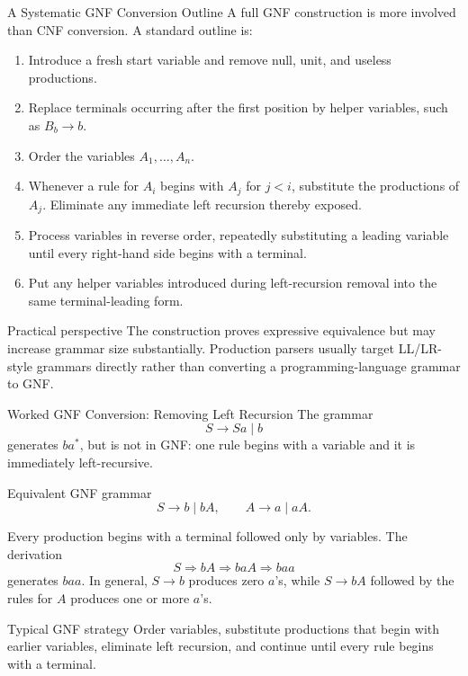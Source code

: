 \documentclass[10pt]{beamer}
\begin{document}
\begin{frame}{A Systematic GNF Conversion Outline}
  \small
  A full GNF construction is more involved than CNF conversion. A standard
  outline is:
  \begin{enumerate}
    \item Introduce a fresh start variable and remove null, unit, and useless
      productions.
    \item Replace terminals occurring after the first position by helper
      variables, such as $B_b\to b$.
    \item Order the variables $A_1,\ldots,A_n$.
    \item Whenever a rule for $A_i$ begins with $A_j$ for $j<i$, substitute
      the productions of $A_j$. Eliminate any immediate left recursion thereby
      exposed.
    \item Process variables in reverse order, repeatedly substituting a
      leading variable until every right-hand side begins with a terminal.
    \item Put any helper variables introduced during left-recursion removal
      into the same terminal-leading form.
  \end{enumerate}
  \begin{alertblock}{Practical perspective}
    The construction proves expressive equivalence but may increase grammar
    size substantially. Production parsers usually target LL/LR-style
    grammars directly rather than converting a programming-language grammar
    to GNF.
  \end{alertblock}
\end{frame}

\begin{frame}{Worked GNF Conversion: Removing Left Recursion}
  \small
  The grammar
  \[
    S\to Sa\mid b
  \]
  generates $ba^*$, but is not in GNF: one rule begins with a variable and it
  is immediately left-recursive.
  \begin{block}{Equivalent GNF grammar}
    \[
      \boxed{S\to b\mid bA,\qquad A\to a\mid aA.}
    \]
  \end{block}
  Every production begins with a terminal followed only by variables. The
  derivation
  \[
    S\Rightarrow bA\Rightarrow baA\Rightarrow baa
  \]
  generates $baa$. In general, $S\to b$ produces zero $a$'s, while
  $S\to bA$ followed by the rules for $A$ produces one or more $a$'s.
  \begin{alertblock}{Typical GNF strategy}
    Order variables, substitute productions that begin with earlier variables,
    eliminate left recursion, and continue until every rule begins with a
    terminal.
  \end{alertblock}
\end{frame}
\end{document}
